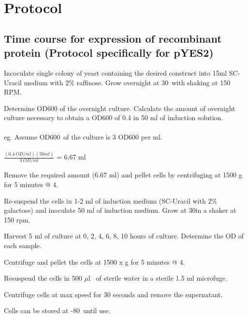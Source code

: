 \section {Protocol}
	\subsection{Time course for expression of recombinant  protein (Protocol specifically for pYES2)}
	\begin{packed_enum}
			\item Incoculate single colony of yeast containing the desired construct into 15ml SC-Uracil medium with 2\% raffinose. Grow overnight at 30\textcelsius \ with shaking at 150 RPM. 
			\item Determine OD{\scriptsize 600} of the overnight culture. Calculate the amount of overnight culture necessary to obtain a OD{\scriptsize 600} of 0.4 in 50 ml of induction solution.\\\\
			eg. Assume OD{\scriptsize 600}\ of the culture is 3 OD{\scriptsize600} per ml.\\ \\
			$\frac {(0.4 \ OD/ml)(50ml)}{3 \ OD/ml}$ = 6.67 ml\\
			\item Remove the required amount (6.67 ml) and pellet cells by centrifuging at 1500 g for 5 minutes @ 4\textcelsius.
			\item Re-suspend the cells in 1-2 ml of induction medium (SC-Uracil with 2\% galactose) and inoculate 50 ml of induction medium. Grow at 30\textcelsius in a shaker at 150 rpm.
			\item Harvest 5 ml of culture at 0, 2, 4, 6, 8, 10 hours of culture. Determine the OD of each sample.
			\item Centrifuge and pellet the cells at 1500 x g for 5 minutes @ 4\textcelsius.
			\item Resuspend the cells in 500 $\mu$l \ of sterile water in a sterile 1.5 ml microfuge.
			\item Centrifuge cells at max speed for 30 seconds and remove the supernatant.
			\item Cells can be stored at -80\textcelsius \ until use.			
	\end{packed_enum}
